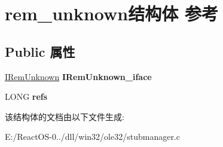 \hypertarget{structrem__unknown}{}\section{rem\+\_\+unknown结构体 参考}
\label{structrem__unknown}
\subsection*{Public 属性}
\begin{DoxyCompactItemize}
\item 
\mbox{\label{structrem__unknown_a7cd2729fe68f1a4011f9badf058692ae}} 
\hyperlink{interface_i_rem_unknown}{I\+Rem\+Unknown} {\bfseries I\+Rem\+Unknown\+\_\+iface}
\item 
\mbox{\label{structrem__unknown_a5b65e59bacca18acf1f81f0d1f87cff5}} 
L\+O\+NG {\bfseries refs}
\end{DoxyCompactItemize}


该结构体的文档由以下文件生成\+:\begin{DoxyCompactItemize}
\item 
E\+:/\+React\+O\+S-\/0../dll/win32/ole32/stubmanager.\+c\end{DoxyCompactItemize}
